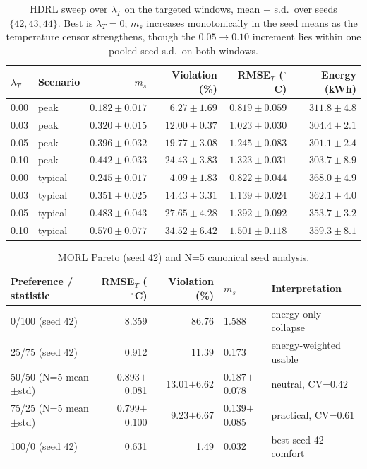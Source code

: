 \documentclass[11pt,a4paper]{article}
\begin{document}
\begin{table}[H]
\centering
\caption{HDRL sweep over $\lambda_T$ on the targeted windows, mean $\pm$ s.d.\ over seeds $\{42,43,44\}$. Best is $\lambda_T=0$; $m_s$ increases monotonically in the seed means as the temperature censor strengthens, though the $0.05\rightarrow0.10$ increment lies within one pooled seed s.d.\ on both windows.}
\label{tab:hdrl}
\small
\begin{tabular}{llrrrr}
\toprule
$\lambda_T$ & Scenario & $m_s$ & Violation (\%) & RMSE$_T$ ($^\circ$C) & Energy (kWh) \\
\midrule
0.00 & peak & $0.182\pm0.017$ & $6.27\pm1.69$ & $0.819\pm0.059$ & $311.8\pm4.8$ \\
0.03 & peak & $0.320\pm0.015$ & $12.00\pm0.37$ & $1.023\pm0.030$ & $304.4\pm2.1$ \\
0.05 & peak & $0.396\pm0.032$ & $19.77\pm3.08$ & $1.245\pm0.083$ & $301.1\pm2.4$ \\
0.10 & peak & $0.442\pm0.033$ & $24.43\pm3.83$ & $1.323\pm0.031$ & $303.7\pm8.9$ \\
0.00 & typical & $0.245\pm0.017$ & $4.09\pm1.83$ & $0.822\pm0.044$ & $368.0\pm4.9$ \\
0.03 & typical & $0.351\pm0.025$ & $14.43\pm3.31$ & $1.139\pm0.024$ & $362.1\pm4.0$ \\
0.05 & typical & $0.483\pm0.043$ & $27.65\pm4.28$ & $1.392\pm0.092$ & $353.7\pm3.2$ \\
0.10 & typical & $0.570\pm0.077$ & $34.52\pm6.42$ & $1.501\pm0.118$ & $359.3\pm8.1$ \\
\bottomrule
\end{tabular}
\end{table}
\begin{table}[H]
\centering
\caption{MORL Pareto (seed 42) and N=5 canonical seed analysis.}
\label{tab:morl_pareto_seed}
\small
\begin{tabular}{lrrll}
\toprule
Preference / statistic & RMSE$_T$ ($^\circ$C) & Violation (\%) & $m_s$ & Interpretation \\
\midrule
0/100 (seed 42) & 8.359 & 86.76 & 1.588 & energy-only collapse \\
25/75 (seed 42) & 0.912 & 11.39 & 0.173 & energy-weighted usable \\
50/50 (N=5 mean$\pm$std) & 0.893$\pm$0.081 & 13.01$\pm$6.62 & 0.187$\pm$0.078 & neutral, CV=0.42 \\
75/25 (N=5 mean$\pm$std) & 0.799$\pm$0.100 & 9.23$\pm$6.67 & 0.139$\pm$0.085 & practical, CV=0.61 \\
100/0 (seed 42) & 0.631 & 1.49 & 0.032 & best seed-42 comfort \\
\bottomrule
\end{tabular}
\end{table}
\end{document}
